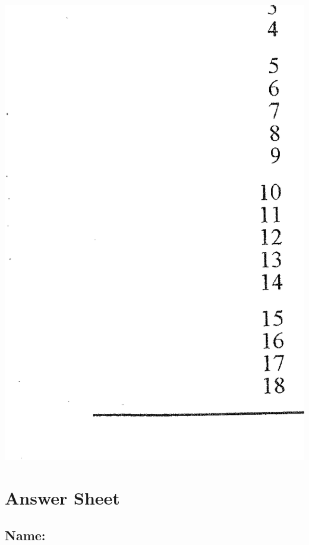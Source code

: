 \documentclass[12pt]{article}
\begin{document}
\begin{adjustwidth}{-1cm}{0cm}
\includegraphics[width=1.1\textwidth, trim = 2cm 4cm 2cm 3cm, clip]{Md2}
\end{adjustwidth}

\newpage

\section*{Answer Sheet\\[0.3cm]}

\subsection*{Name:\quad\underline{\hspace{11.45cm}}\\[0.3cm]}
\end{document}
